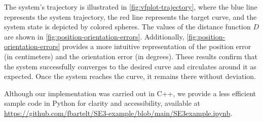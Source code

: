 The system's trajectory is illustrated in \cref{fig:vfplot-trajectory}, where the blue line represents the system trajectory, the red line represents the target curve, and the system state is depicted by colored spheres. The values of the distance function $D$ are shown in \cref{fig:position-orientation-errors}. Additionally, \cref{fig:position-orientation-errors} provides a more intuitive representation of the position error (in centimeters) and the orientation error (in degrees). These results confirm that the system successfully converges to the desired curve and circulates around it as expected. Once the system reaches the curve, it remains there without deviation. 

Although our implementation was carried out in C++, we provide a less efficient sample code in Python for clarity and accessibility, available at \url{https://github.com/fbartelt/SE3-example/blob/main/SE3example.ipynb}.

